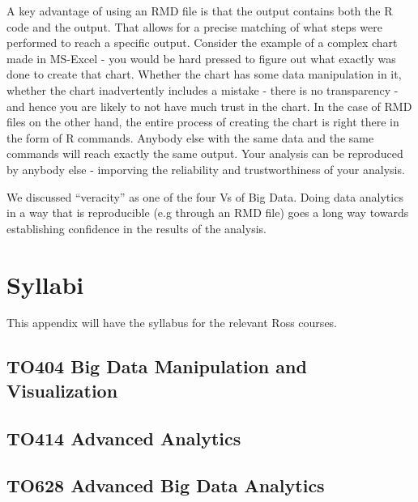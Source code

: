 \documentclass[]{krantz}
\begin{document}
A key advantage of using an RMD file is that the output contains both
the R code and the output. That allows for a precise matching of what
steps were performed to reach a specific output. Consider the example of
a complex chart made in MS-Excel - you would be hard pressed to figure
out what exactly was done to create that chart. Whether the chart has
some data manipulation in it, whether the chart inadvertently includes a
mistake - there is no transparency - and hence you are likely to not
have much trust in the chart. In the case of RMD files on the other
hand, the entire process of creating the chart is right there in the
form of R commands. Anybody else with the same data and the same
commands will reach exactly the same output. Your analysis can be
reproduced by anybody else - imporving the reliability and
trustworthiness of your analysis.

We discussed ``veracity'' as one of the four Vs of Big Data. Doing data
analytics in a way that is reproducible (e.g through an RMD file) goes a
long way towards establishing confidence in the results of the analysis.

\cleardoublepage 

\appendix {}


\chapter{Syllabi}\label{syllabi}

This appendix will have the syllabus for the relevant Ross courses.

\section{TO404 Big Data Manipulation and
Visualization}\label{to404-big-data-manipulation-and-visualization}

\section{TO414 Advanced Analytics}\label{to414-advanced-analytics}

\section{TO628 Advanced Big Data
Analytics}\label{to628-advanced-big-data-analytics}



\backmatter
\printindex
\end{document}
